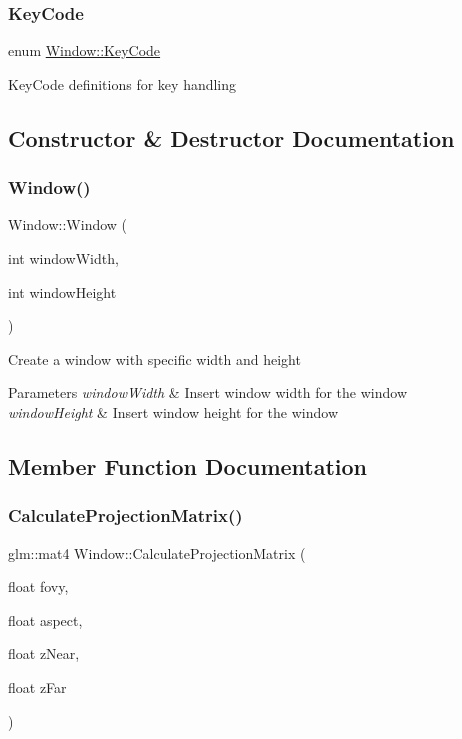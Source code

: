 \subsubsection{\texorpdfstring{KeyCode}{KeyCode}}
{\footnotesize\ttfamily enum \mbox{\hyperlink{class_window_a4915898e3e02586ae359c8cfb9114717}{Window\+::\+Key\+Code}}}

Key\+Code definitions for key handling 

\subsection{Constructor \& Destructor Documentation}
\mbox{\label{class_window_a3acd754419d920ce16897b8357fb705d}} 
\subsubsection{\texorpdfstring{Window()}{Window()}}
{\footnotesize\ttfamily Window\+::\+Window (\begin{DoxyParamCaption}\item[{int}]{window\+Width,  }\item[{int}]{window\+Height }\end{DoxyParamCaption})}

Create a window with specific width and height 
\begin{DoxyParams}{Parameters}
{\em window\+Width} & Insert window width for the window \\
\hline
{\em window\+Height} & Insert window height for the window \\
\hline
\end{DoxyParams}


\subsection{Member Function Documentation}
\mbox{\label{class_window_ad82e66f4b582e9dc6215dee81cc03e6a}} 
\subsubsection{\texorpdfstring{CalculateProjectionMatrix()}{CalculateProjectionMatrix()}}
{\footnotesize\ttfamily glm\+::mat4 Window\+::\+Calculate\+Projection\+Matrix (\begin{DoxyParamCaption}\item[{float}]{fovy,  }\item[{float}]{aspect,  }\item[{float}]{z\+Near,  }\item[{float}]{z\+Far }\end{DoxyParamCaption})}

